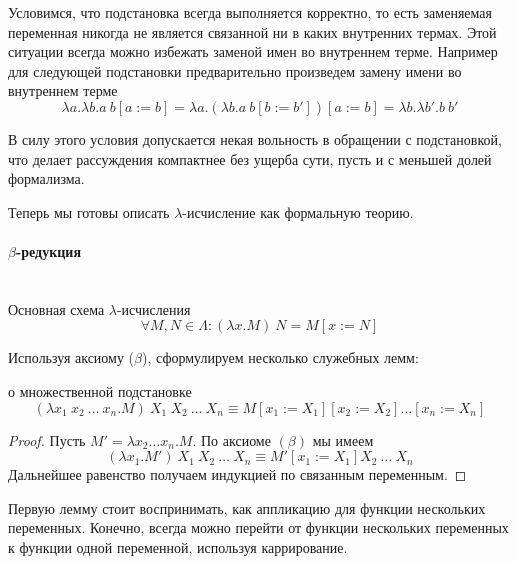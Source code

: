 \documentclass[lambda.tex]{subfiles}
\begin{document}

Условимся, что подстановка всегда выполняется корректно, то есть заменяемая переменная никогда не является связанной ни в каких внутренних термах. Этой ситуации всегда можно избежать заменой имен во внутреннем терме. Например для следующей подстановки предварительно произведем замену имени во внутреннем терме
\[\lambda a.\lambda b.a\ b[a := b] = \lambda a.(\lambda b.a\ b[b := b'])[a := b] = \lambda b.\lambda b'.b\ b'\]

В силу этого условия допускается некая вольность в обращении с подстановкой, что делает рассуждения компактнее без ущерба сути, пусть и с меньшей долей формализма.


Теперь мы готовы описать $\lambda$-исчисление как формальную теорию.

\newpage
\paragraph{$\beta$-редукция} %
\label{par:beta reduction}~\\

Основная схема $\lambda$-исчисления
\begin{equation*}
	\forall M, N \in \Lambda : (\lambda x.M)\ N = M[x := N]\tag{$\beta$}
\end{equation*}

Используя аксиому ($\beta$), сформулируем несколько служебных лемм:
\begin{lemma}{о множественной подстановке}
	\[(\lambda x_1 \ x_2 \ \dots\ x_n .M)\ X_1 \ X_2 \ \dots\ X_n \equiv M[x_1 := X_1 ][x_2 := X_2]\dots[x_n := X_n ]\]
\end{lemma}
\begin{proof}
	Пусть $M' = \lambda x_2 \dots x_n .M$. По аксиоме $(\beta)$ мы имеем
	\[(\lambda x_1 .M')\ X_1 \ X_2 \ \dots\ X_n \equiv M'[x_1 := X_1 ] X_2 \ \dots\ X_n\]
	Дальнейшее равенство получаем индукцией по связанным переменным.
\end{proof}

\begin{tcolorbox}
	Первую лемму стоит воспринимать, как аппликацию для функции нескольких переменных. Конечно, всегда можно перейти от функции нескольких переменных к функции одной переменной, используя каррирование.
\end{tcolorbox}
\end{document}
